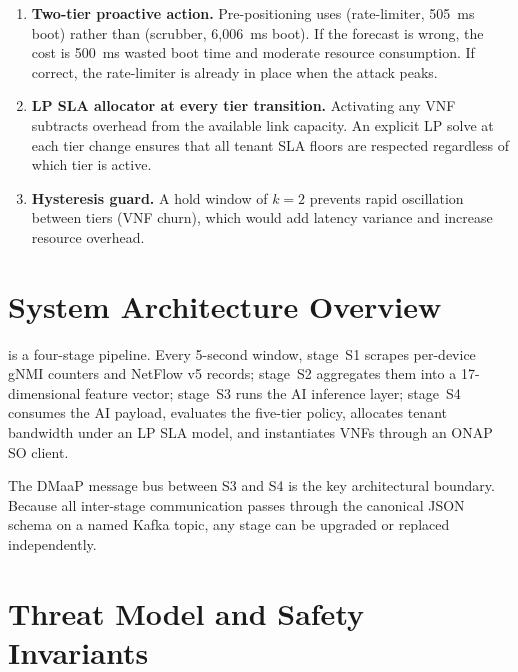\begin{enumerate}
  \item \textbf{Two-tier proactive action.} Pre-positioning uses
         (rate-limiter, 505~ms boot) rather than 
        (scrubber, 6{,}006~ms boot). If the forecast is wrong, the
        cost is 500~ms wasted boot time and moderate resource consumption.
        If correct, the rate-limiter is already in place when the attack
        peaks.

  \item \textbf{LP SLA allocator at every tier transition.} Activating
        any VNF subtracts overhead from the available link capacity.
        An explicit LP solve at each tier change ensures that all tenant
        SLA floors are respected regardless of which tier is active.

  \item \textbf{Hysteresis guard.} A hold window of $k{=}2$ prevents
        rapid oscillation between tiers (VNF churn), which would add
        latency variance and increase resource overhead.
\end{enumerate}

\section{System Architecture Overview}
\label{sec:arch-overview}

\padonap{} is a four-stage pipeline. Every 5-second window, stage~S1
scrapes per-device gNMI counters and NetFlow v5 records;
stage~S2 aggregates them into a 17-dimensional feature vector;
stage~S3 runs the AI inference layer; stage~S4 consumes the AI payload, evaluates
the five-tier policy, allocates tenant bandwidth under an LP SLA model,
and instantiates VNFs through an ONAP SO client.

The DMaaP message bus between S3 and S4 is the key architectural boundary. Because all inter-stage
communication passes through the canonical JSON schema on a named Kafka
topic, any stage can be upgraded or replaced independently.

\section{Threat Model and Safety Invariants}
\label{sec:threat-safety}

